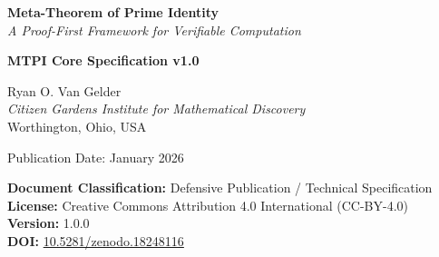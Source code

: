 \documentclass[11pt,a4paper]{article}
\begin{document}
\begin{titlepage}
    \centering
    \vspace*{2cm}

    {\Huge\bfseries Meta-Theorem of Prime Identity\\[0.5cm]}
    {\LARGE\itshape A Proof-First Framework for Verifiable Computation\\[1cm]}

    {\Large\textbf{MTPI Core Specification v1.0}\\[2cm]}

    {\large
    Ryan O. Van Gelder\\[0.3cm]
    \textit{Citizen Gardens Institute for Mathematical Discovery}\\
    Worthington, Ohio, USA\\[2cm]
    }

    {\large Publication Date: January 2026\\[0.5cm]}

    \vfill

    {\normalsize
    \textbf{Document Classification:} Defensive Publication / Technical Specification\\
    \textbf{License:} Creative Commons Attribution 4.0 International (CC-BY-4.0)\\
    \textbf{Version:} 1.0.0\\[0.3cm]
    \textbf{DOI:} \href{https://doi.org/10.5281/zenodo.18248116}{10.5281/zenodo.18248116}
    }
\end{titlepage}

\tableofcontents
\newpage

\begin{abstract}
The \textbf{Meta-Theorem of Prime Identity (MTPI)} is an architectural pattern and protocol stack for building \emph{proof-first} digital systems. Instead of relying on institutional trust, surveillance, or opaque algorithms, MTPI requires that every state transition be accompanied by a cryptographic proof that the transition is \emph{lawful}, \emph{ethically constrained}, and \emph{user-sovereign}.

Lawfulness is defined not only in terms of syntactic validity (e.g., input formats, signatures) but also with respect to higher-order invariants: ethical constraints, bounded drift, jurisdictional rules, and user consent.

\textbf{Core Claim:} Every lawful identity in the system can be represented as a composition of prime identities, and this decomposition is stable under lawful recursion.

An MTPI identity is anchored by prime-based checks and is mathematically constrained by strict time-drift bounds, typically $\delta(t) \leq 0.3$. This ensures that proofs are not only valid but also \emph{live}, preventing replay attacks and impersonation by ensuring a proof is linked to a specific, verifiable moment in time.
\end{abstract}
\end{document}
